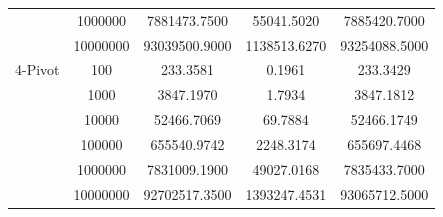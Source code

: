 \documentclass{article}
\begin{document}
\begin{center}
\begin{tabular}{ |c c | c c c| }
                        & 1000000  & 7881473.7500   & 55041.5020    & 7885420.7000 \\
                        & 10000000 & 93039500.9000  & 1138513.6270  & 93254088.5000 \\
        \hline
        4-Pivot         & 100      & 233.3581       & 0.1961        & 233.3429 \\
                        & 1000     & 3847.1970      & 1.7934        & 3847.1812 \\
                        & 10000    & 52466.7069     & 69.7884       & 52466.1749 \\
                        & 100000   & 655540.9742    & 2248.3174     & 655697.4468 \\
                        & 1000000  & 7831009.1900   & 49027.0168    & 7835433.7000 \\
                        & 10000000 & 92702517.3500  & 1393247.4531  & 93065712.5000 \\
        \hline
    \end{tabular}


\end{center}
\end{document}
